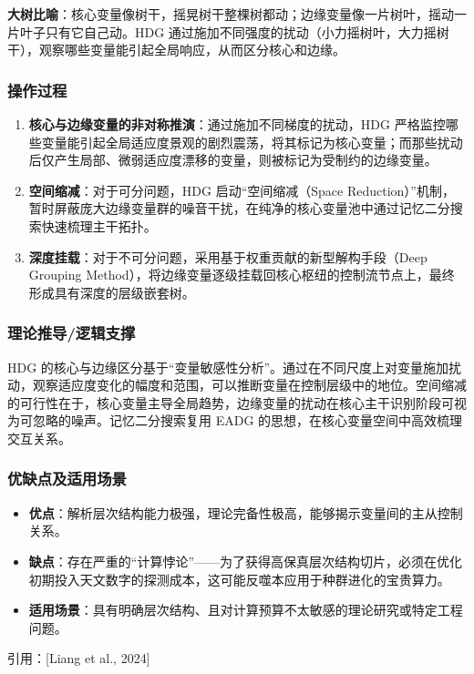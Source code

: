 \textbf{大树比喻}：核心变量像树干，摇晃树干整棵树都动；边缘变量像一片树叶，摇动一片叶子只有它自己动。HDG 通过施加不同强度的扰动（小力摇树叶，大力摇树干），观察哪些变量能引起全局响应，从而区分核心和边缘。

\subsubsection*{操作过程}
\begin{enumerate}
    \item \textbf{核心与边缘变量的非对称推演}：通过施加不同梯度的扰动，HDG 严格监控哪些变量能引起全局适应度景观的剧烈震荡，将其标记为核心变量；而那些扰动后仅产生局部、微弱适应度漂移的变量，则被标记为受制约的边缘变量。
    \item \textbf{空间缩减}：对于可分问题，HDG 启动“空间缩减（Space Reduction）”机制，暂时屏蔽庞大边缘变量群的噪音干扰，在纯净的核心变量池中通过记忆二分搜索快速梳理主干拓扑。
    \item \textbf{深度挂载}：对于不可分问题，采用基于权重贡献的新型解构手段（Deep Grouping Method），将边缘变量逐级挂载回核心枢纽的控制流节点上，最终形成具有深度的层级嵌套树。
\end{enumerate}

\subsubsection*{理论推导/逻辑支撑}
HDG 的核心与边缘区分基于“变量敏感性分析”。通过在不同尺度上对变量施加扰动，观察适应度变化的幅度和范围，可以推断变量在控制层级中的地位。空间缩减的可行性在于，核心变量主导全局趋势，边缘变量的扰动在核心主干识别阶段可视为可忽略的噪声。记忆二分搜索复用 EADG 的思想，在核心变量空间中高效梳理交互关系。

\subsubsection*{优缺点及适用场景}
\begin{itemize}
    \item \textbf{优点}：解析层次结构能力极强，理论完备性极高，能够揭示变量间的主从控制关系。
    \item \textbf{缺点}：存在严重的“计算悖论”——为了获得高保真层次结构切片，必须在优化初期投入天文数字的探测成本，这可能反噬本应用于种群进化的宝贵算力。
    \item \textbf{适用场景}：具有明确层次结构、且对计算预算不太敏感的理论研究或特定工程问题。
\end{itemize}
引用：[Liang et al., 2024]

